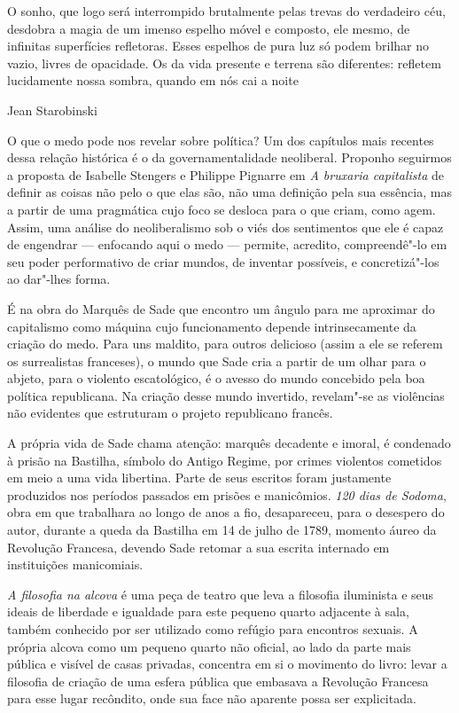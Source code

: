 \epigraph{O sonho, que logo será interrompido brutalmente pelas trevas do
verdadeiro céu, desdobra a magia de um imenso espelho móvel e composto,
ele mesmo, de infinitas superfícies refletoras. Esses espelhos de pura
luz só podem brilhar no vazio, livres de opacidade. Os da vida presente
e terrena são diferentes: refletem lucidamente nossa sombra, quando em
nós cai a noite}{Jean Starobinski}

O que o medo pode nos revelar sobre política? Um dos capítulos mais
recentes dessa relação histórica é o da governamentalidade neoliberal.
Proponho seguirmos a proposta de Isabelle Stengers e Philippe Pignarre em
\emph{A bruxaria capitalista} de definir as coisas não pelo o que elas
são, não uma definição pela sua essência, mas a partir de uma pragmática
cujo foco se desloca para o que criam, como agem. Assim, uma análise do
neoliberalismo sob o viés dos sentimentos que ele é capaz de engendrar ---
enfocando aqui o medo --- permite, acredito, compreendê"-lo em seu poder performativo de criar mundos, de inventar possíveis, e concretizá"-los ao dar"-lhes forma.

\asterisc

É na obra do Marquês de Sade que encontro um ângulo para me aproximar
do capitalismo como máquina cujo funcionamento depende intrinsecamente
da criação do medo. Para uns maldito, para outros delicioso (assim a ele
se referem os surrealistas franceses), o mundo que Sade cria a partir de
um olhar para o abjeto, para o violento escatológico, é o avesso do
mundo concebido pela boa política republicana. Na criação desse
mundo invertido, revelam"-se as violências não evidentes que estruturam o projeto
republicano francês.

A própria vida de Sade chama atenção: marquês decadente e imoral,
é condenado à prisão na Bastilha, símbolo do Antigo Regime, por crimes
violentos cometidos em meio a uma vida libertina. Parte de seus escritos
foram justamente produzidos nos períodos passados em prisões e
manicômios. \emph{120 dias de Sodoma}, obra em que trabalhara ao longo
de anos a fio, desapareceu, para o desespero do autor, durante a queda
da Bastilha em 14 de julho de 1789, momento áureo da Revolução Francesa,
devendo Sade retomar a sua escrita internado em instituições
manicomiais.

\emph{A filosofia na alcova} é uma peça de teatro que leva a filosofia
iluminista e seus ideais de liberdade e igualdade para este
pequeno quarto adjacente à sala, também conhecido por ser utilizado como
refúgio para encontros sexuais. A própria alcova como um pequeno quarto
não oficial, ao lado da parte mais pública e visível de casas privadas,
concentra em si o movimento do livro: levar a filosofia de criação de
uma esfera pública que embasava a Revolução Francesa para esse lugar
recôndito, onde sua face não aparente possa ser explicitada.

